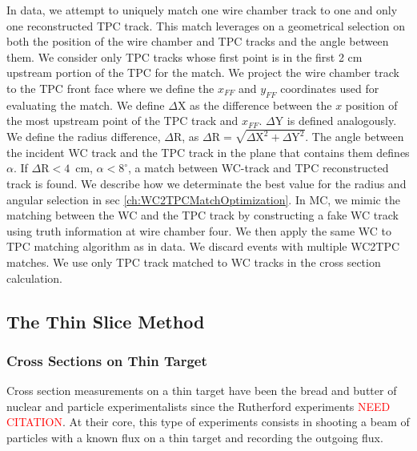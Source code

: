 In data, we attempt to uniquely match one wire chamber track to one and only one reconstructed TPC track. This match leverages on a geometrical selection on both the position of the wire chamber and TPC tracks and the angle between them. We consider only TPC tracks whose first point is in the first 2 cm upstream portion of the TPC for the match.  We project the wire chamber track to the TPC front face where we define the $x_{FF}$ and $y_{FF}$ coordinates used for evaluating the match.  We define $\Delta$X as the difference between the $x$ position of the most upstream point of the TPC track and $x_{FF}$.  $\Delta$Y is defined analogously. We define the radius difference, $\Delta$R, as $ \Delta \text{R} =  \sqrt{ \Delta \text{X}^2 +  \Delta \text{Y}^2}  $. The angle between the incident WC track and the TPC track in the plane that contains them defines $\alpha$.  If  $\Delta \text{R} < 4 $~cm, $\alpha < 8^\circ $,  a match between WC-track and TPC reconstructed track is found. We describe  how we determinate the best value for the radius and angular selection in sec \ref{ch:WC2TPCMatchOptimization}.
In MC, we mimic the matching between the WC and the TPC track by constructing a fake WC track using truth information at wire chamber four. We then apply the same WC to TPC matching algorithm as in data. 
We discard events with multiple WC2TPC matches. We use only TPC track matched to WC tracks in the cross section calculation.


\subsection{The Thin Slice Method}\label{ch:ThinSliceMethod}
\subsubsection{Cross Sections on Thin Target}
Cross section measurements on a thin target have been the bread and butter of nuclear and particle experimentalists since the Rutherford experiments \textcolor{red}{NEED CITATION}. At their core, this type of experiments consists in shooting a beam of particles with a known flux on a thin target and recording the outgoing flux. 


